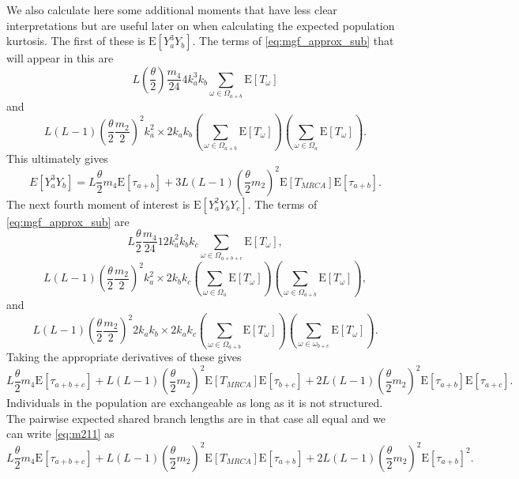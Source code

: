 \documentclass{article}
\newcommand{\T}{\frac{\theta}{2}}
\newcommand{\E}{\mathrm{E}}
\begin{document}
We also calculate here some additional moments that have less clear
interpretations but are useful later on when calculating the expected population
kurtosis. The first of these is $\E[Y_a^3Y_b]$. The terms of
\eqref{eq:mgf_approx_sub} that will appear in this are
\begin{equation*}
  L \left(\T\right) \frac{m_4}{24} 4 k_a^3k_b \sum_{\omega \in \Omega_{a+b}} \E[T_\omega]
\end{equation*}
and
\begin{equation*}
  L(L-1)\left(\T \frac{m_2}{2}\right)^2 k_a^2 \times 2k_ak_b
  \left( \sum_{\omega \in \Omega_{a+b}} \E[T_\omega] \right) \left( \sum_{\omega \in \Omega_a} \E[T_\omega] \right).
\end{equation*}
This ultimately gives
\begin{equation}
  \label{eq:m31}
  E[Y_a^3Y_b] = L \T m_4 \E[\tau_{a+b}] + 3L(L-1) \left(\T m_2\right)^2 \E[T_{MRCA}]\E[\tau_{a+b}].
\end{equation}
The next fourth moment of interest is $\E[Y_a^2Y_bY_c]$. The terms of
\eqref{eq:mgf_approx_sub} are
\begin{equation*}
  L \T \frac{m_4}{24} 12k_a^2k_bk_c \sum_{\omega \in \Omega_{a+b+c}} \E[T_\omega],
\end{equation*}
\begin{equation*}
  L(L-1) \left(\T \frac{m_2}{2}\right)^2 k_a^2 \times 2k_bk_c
  \left( \sum_{\omega \in \Omega_a} \E[T_\omega] \right)\left( \sum_{\omega \in \Omega_{a+b}} \E[T_\omega] \right),
\end{equation*}
and 
\begin{equation*}
  L(L-1) \left(\T \frac{m_2}{2}\right)^2 2k_ak_b \times 2k_ak_c \left( \sum_{\omega \in \Omega_{a+b}} \E[T_\omega] \right)
  \left( \sum_{\omega \in \omega_{b+c}} \E[T_\omega] \right).
\end{equation*}
Taking the appropriate derivatives of these gives
\begin{equation}
  \label{eq:m211}
  L \T m_4 \E[\tau_{a+b+c}] + L(L-1)\left(\T m_2\right)^2\E[T_{MRCA}]\E[\tau_{b+c}] +
  2L(L-1) \left(\T m_2\right)^2\E[\tau_{a+b}]\E[\tau_{a+c}].
\end{equation}
Individuals in the population are exchangeable as long as it is not structured.
The pairwise expected shared branch lengths are in that case all equal and we
can write \eqref{eq:m211} as
\begin{equation}
  \label{eq:m211s}
  L \T m_4 \E[\tau_{a+b+c}] + L(L-1)\left(\T m_2\right)^2\E[T_{MRCA}]\E[\tau_{a+b}] +
  2L(L-1) \left(\T m_2\right)^2\E[\tau_{a+b}]^2.
\end{equation}
\end{document}
